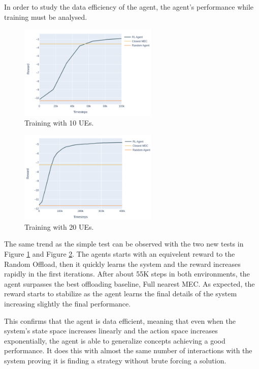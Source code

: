 In order to study the data efficiency of the agent, the agent's performance while training must be analysed.


\begin{minipage}{0.5\textwidth}
\begin{figure}[H]
  \centering
  \includegraphics[width=250px]{images/5_10_training.png}
  \caption{Training with 10 \acrshort{UE}s.}  \label{5_10_training}
\end{figure}
\end{minipage}
\begin{minipage}{0.5\textwidth}
\begin{figure}[H]
  \centering
  \includegraphics[width=250px]{images/5_20_training.png}
  \caption{Training with 20 \acrshort{UE}s.}  \label{5_20_training}
\end{figure}
\end{minipage}

\hfill \break
The same trend as the simple test can be observed with the two new tests in Figure \ref{5_10_training} and Figure \ref{5_20_training}. The agents starts with an equivelent reward to the Random Offload, then it quickly learns the system and the reward increases rapidly in the first iterations. After about 55K steps in both environments, the agent surpasses the best offloading baseline, Full nearest MEC. As expected, the reward starts to stabilize as the agent learns the final details of the system increasing slightly the final performance.

This confirms that the agent is data efficient, meaning that even when the system's state space increases linearly and the action space increases exponentially, the agent is able to generalize concepts achieving a good performance. It does this with almost the same number of interactions with the system proving it is finding a strategy without brute forcing a solution.

